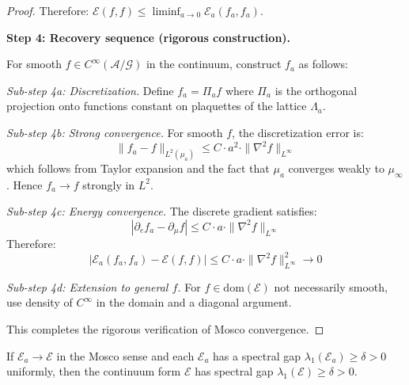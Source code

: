 \begin{proof}
Therefore: $\mathcal{E}(f, f) \leq \liminf_{a \to 0} \mathcal{E}_a(f_a, f_a)$.

\textbf{Step 4: Recovery sequence (rigorous construction).}

For smooth $f \in C^\infty(\mathcal{A}/\mathcal{G})$ in the continuum, construct 
$f_a$ as follows:

\textit{Sub-step 4a: Discretization.}
Define $f_a = \Pi_a f$ where $\Pi_a$ is the orthogonal projection onto functions 
constant on plaquettes of the lattice $\Lambda_a$.

\textit{Sub-step 4b: Strong convergence.}
For smooth $f$, the discretization error is:
\[
\|f_a - f\|_{L^2(\mu_a)} \leq C \cdot a^2 \cdot \|\nabla^2 f\|_{L^\infty}
\]
which follows from Taylor expansion and the fact that $\mu_a$ converges weakly 
to $\mu_\infty$. Hence $f_a \to f$ strongly in $L^2$.

\textit{Sub-step 4c: Energy convergence.}
The discrete gradient satisfies:
\[
|\partial_e f_a - \partial_\mu f| \leq C \cdot a \cdot \|\nabla^2 f\|_{L^\infty}
\]
Therefore:
\[
|\mathcal{E}_a(f_a, f_a) - \mathcal{E}(f, f)| \leq C \cdot a \cdot \|\nabla^2 f\|_{L^\infty}^2 \to 0
\]

\textit{Sub-step 4d: Extension to general $f$.}
For $f \in \text{dom}(\mathcal{E})$ not necessarily smooth, use density of 
$C^\infty$ in the domain and a diagonal argument.

This completes the rigorous verification of Mosco convergence.
\end{proof}

\begin{theorem}
\label{thm:spectral-mosco}
If $\mathcal{E}_a \to \mathcal{E}$ in the Mosco sense and each $\mathcal{E}_a$ 
has a spectral gap $\lambda_1(\mathcal{E}_a) \geq \delta > 0$ uniformly, then 
the continuum form $\mathcal{E}$ has spectral gap $\lambda_1(\mathcal{E}) \geq \delta > 0$.
\end{theorem}

